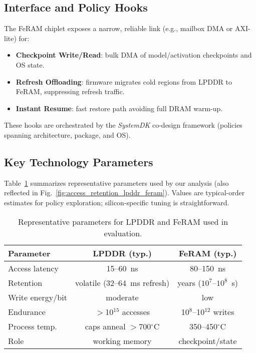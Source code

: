 

\subsection{Interface and Policy Hooks}
The FeRAM chiplet exposes a narrow, reliable link (e.g., mailbox DMA or AXI-lite) for:
\begin{itemize}
  \item \textbf{Checkpoint Write/Read}: bulk DMA of model/activation checkpoints and OS state.
  \item \textbf{Refresh Offloading}: firmware migrates cold regions from LPDDR to FeRAM, suppressing refresh traffic.
  \item \textbf{Instant Resume}: fast restore path avoiding full DRAM warm-up.
\end{itemize}
These hooks are orchestrated by the \emph{SystemDK} co-design framework (policies spanning architecture, package, and OS).

\subsection{Key Technology Parameters}
Table~\ref{tab:tech_params} summarizes representative parameters used by our analysis (also reflected in Fig.~\ref{fig:access_retention_lpddr_feram}).
Values are typical-order estimates for policy exploration; silicon-specific tuning is straightforward.

\begin{table}[t]
  \centering
  \caption{Representative parameters for LPDDR and FeRAM used in evaluation.}
  \label{tab:tech_params}
  \vspace{2pt}
  \small
  \setlength{\tabcolsep}{5pt}
  \begin{tabular}{@{}lcc@{}}
    \toprule
    Parameter & LPDDR (typ.) & FeRAM (typ.) \\
    \midrule
    Access latency & 15--60~ns & 80--150~ns \\
    Retention & volatile (32--64~ms refresh) & years ($10^7$--$10^8$~s) \\
    Write energy/bit & moderate & low \\
    Endurance & $>$10$^{15}$ accesses & 10$^8$--10$^{12}$ writes \\
    Process temp. & caps anneal $>$700$^\circ$C & 350--450$^\circ$C \\
    Role & working memory & checkpoint/state \\
    \bottomrule
  \end{tabular}
\end{table}
